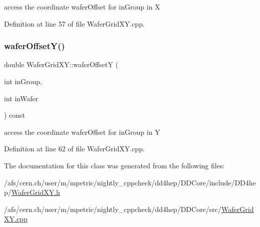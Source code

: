 access the coordinate wafer\+Offset for in\+Group in X 



Definition at line 57 of file Wafer\+Grid\+X\+Y.\+cpp.

\hypertarget{class_d_d4hep_1_1_geometry_1_1_wafer_grid_x_y_aa20b7b55b5a57dc9d8bf7d8df94a1108}{}\label{class_d_d4hep_1_1_geometry_1_1_wafer_grid_x_y_aa20b7b55b5a57dc9d8bf7d8df94a1108} 
\subsubsection{\texorpdfstring{wafer\+Offset\+Y()}{waferOffsetY()}}
{\footnotesize\ttfamily double Wafer\+Grid\+X\+Y\+::wafer\+OffsetY (\begin{DoxyParamCaption}\item[{int}]{in\+Group,  }\item[{int}]{in\+Wafer }\end{DoxyParamCaption}) const}



access the coordinate wafer\+Offset for in\+Group in Y 



Definition at line 62 of file Wafer\+Grid\+X\+Y.\+cpp.



The documentation for this class was generated from the following files\+:\begin{DoxyCompactItemize}
\item 
/afs/cern.\+ch/user/m/mpetric/nightly\+\_\+cppcheck/dd4hep/\+D\+D\+Core/include/\+D\+D4hep/\hyperlink{_d_d_core_2include_2_d_d4hep_2_wafer_grid_x_y_8h}{Wafer\+Grid\+X\+Y.\+h}\item 
/afs/cern.\+ch/user/m/mpetric/nightly\+\_\+cppcheck/dd4hep/\+D\+D\+Core/src/\hyperlink{_d_d_core_2src_2_wafer_grid_x_y_8cpp}{Wafer\+Grid\+X\+Y.\+cpp}\end{DoxyCompactItemize}
